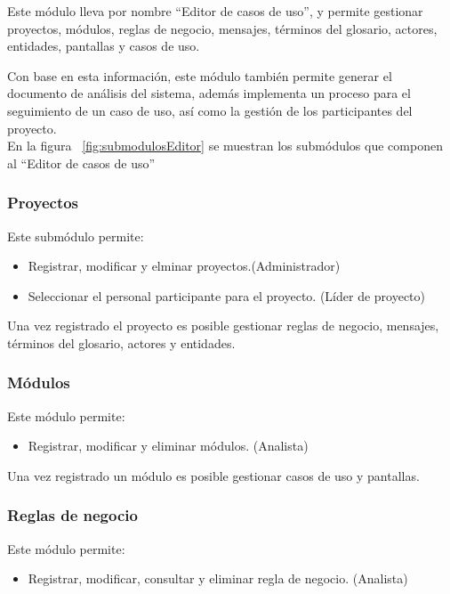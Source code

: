 Este módulo lleva por nombre ``Editor de casos de uso'', y permite gestionar proyectos, módulos, reglas de negocio, mensajes, términos del glosario, actores, entidades, pantallas y casos de uso.

Con base en esta información, este módulo también permite generar el documento de análisis del sistema, además implementa un proceso para el seguimiento de un caso de uso, así como la gestión de los participantes del proyecto.\\

En la figura ~\ref{fig:submodulosEditor} se muestran los submódulos que componen al ``Editor de casos de uso''


\subsubsection{Proyectos}
	Este submódulo permite:
	
	\begin{itemize}
		\item Registrar, modificar y elminar proyectos.(Administrador)
		\item Seleccionar el personal participante para el proyecto. (Líder de proyecto)
	\end{itemize}
	
	Una vez registrado el proyecto es posible gestionar reglas de negocio, mensajes, términos del glosario, actores y entidades. 
		
\subsubsection{Módulos}
	Este módulo permite:
	\begin{itemize}
		\item Registrar, modificar y eliminar módulos. (Analista)
	\end{itemize}

	Una vez registrado un módulo es posible gestionar casos de uso y pantallas.


\subsubsection{Reglas de negocio}
	Este módulo permite:
	\begin{itemize}
		\item Registrar, modificar, consultar y eliminar regla de negocio. (Analista)
	\end{itemize}

